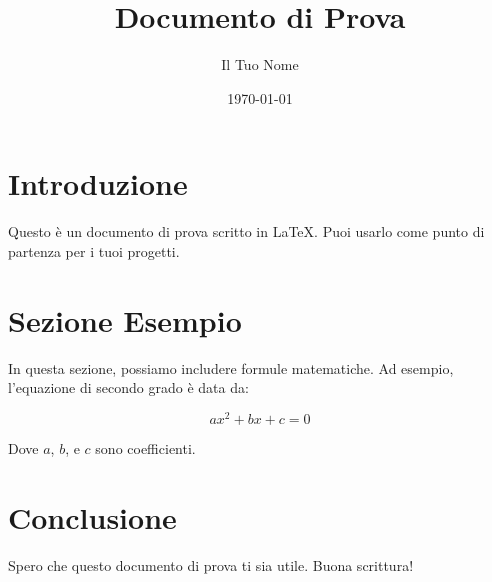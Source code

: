 \documentclass{article}
\title{Documento di Prova}
\author{Il Tuo Nome}
\date{\today}
\begin{document}
\maketitle

\section{Introduzione}
Questo è un documento di prova scritto in \LaTeX. Puoi usarlo come punto di partenza per i tuoi progetti.

\section{Sezione Esempio}
In questa sezione, possiamo includere formule matematiche. Ad esempio, l'equazione di secondo grado è data da:

\[
ax^2 + bx + c = 0
\]

Dove \(a\), \(b\), e \(c\) sono coefficienti.

\section{Conclusione}
Spero che questo documento di prova ti sia utile. Buona scrittura!
\end{document}
